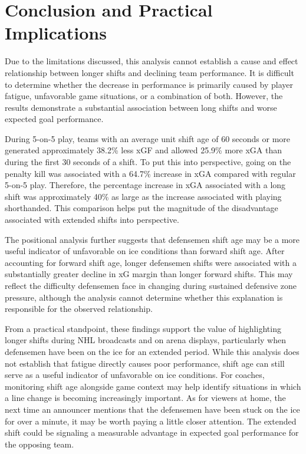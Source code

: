 \documentclass[
  12pt]{article}
\begin{document}
\section{Conclusion and Practical
Implications}\label{conclusion-and-practical-implications}

Due to the limitations discussed, this analysis cannot establish a cause
and effect relationship between longer shifts and declining team
performance. It is difficult to determine whether the decrease in
performance is primarily caused by player fatigue, unfavorable game
situations, or a combination of both. However, the results demonstrate a
substantial association between long shifts and worse expected goal
performance.

During 5-on-5 play, teams with an average unit shift age of 60 seconds
or more generated approximately 38.2\% less xGF and allowed 25.9\% more
xGA than during the first 30 seconds of a shift. To put this into
perspective, going on the penalty kill was associated with a 64.7\%
increase in xGA compared with regular 5-on-5 play. Therefore, the
percentage increase in xGA associated with a long shift was
approximately 40\% as large as the increase associated with playing
shorthanded. This comparison helps put the magnitude of the disadvantage
associated with extended shifts into perspective.

The positional analysis further suggests that defensemen shift age may
be a more useful indicator of unfavorable on ice conditions than forward
shift age. After accounting for forward shift age, longer defensemen
shifts were associated with a substantially greater decline in xG margin
than longer forward shifts. This may reflect the difficulty defensemen
face in changing during sustained defensive zone pressure, although the
analysis cannot determine whether this explanation is responsible for
the observed relationship.

From a practical standpoint, these findings support the value of
highlighting longer shifts during NHL broadcasts and on arena displays,
particularly when defensemen have been on the ice for an extended
period. While this analysis does not establish that fatigue directly
causes poor performance, shift age can still serve as a useful indicator
of unfavorable on ice conditions. For coaches, monitoring shift age
alongside game context may help identify situations in which a line
change is becoming increasingly important. As for viewers at home, the
next time an announcer mentions that the defensemen have been stuck on
the ice for over a minute, it may be worth paying a little closer
attention. The extended shift could be signaling a measurable advantage
in expected goal performance for the opposing team.
\end{document}
